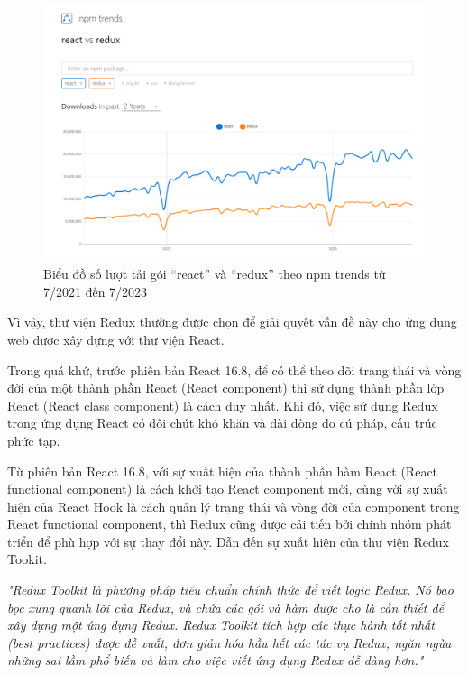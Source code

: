 \begin{figure}[H]
      \centering
      \includegraphics[width=\textwidth]{applied-thesis-chapters/chapter-6/Biểu đồ số lượt tải gói “react” và “redux” theo npm trends trong 2 năm.png}
      \caption{Biểu đồ số lượt tải gói “react” và “redux” theo npm trends từ 7/2021 đến 7/2023}
      \label{fig:BieuDoLuotTai}
\end{figure}

Vì vậy, thư viện Redux thường được chọn để giải quyết vấn đề này cho ứng dụng web được xây dựng với thư viện React.

\tab \tab Trong quá khứ, trước phiên bản React 16.8, để có thể theo dõi trạng thái và vòng đời của một thành phần React (React component) thì sử dụng thành phần lớp React (React class component) là cách duy nhất.
Khi đó, việc sử dụng Redux trong ứng dụng React có đôi chút khó khăn và dài dòng do cú pháp, cấu trúc phức tạp.

Từ phiên bản React 16.8, với sự xuất hiện của thành phần hàm React (React functional component) là cách khởi tạo React component mới, cùng với sự xuất hiện của React Hook là cách quản lý trạng thái và vòng đời của component trong React functional component, thì Redux cũng được cải tiến bởi chính nhóm phát triển để phù hợp với sự thay đổi này.
Dẫn đến sự xuất hiện của thư viện Redux Tookit.

\textit{"Redux Toolkit là phương pháp tiêu chuẩn chính thức để viết logic Redux.
      Nó bao bọc xung quanh lõi của Redux, và chứa các gói và hàm được cho là cần thiết để xây dựng một ứng dụng Redux.
      Redux Toolkit tích hợp các thực hành tốt nhất (best practices) được đề xuất, đơn giản hóa hầu hết các tác vụ Redux, ngăn ngừa những sai lầm phổ biến và làm cho việc viết ứng dụng Redux dễ dàng hơn."} \cite{chap4bib1}
\par

